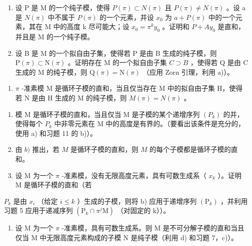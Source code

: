 \begin{enumerate}
\def\labelenumi{\alph{enumi})}
\item
  设 P 是 M 的一个纯子模，使得 \(P(\pi) \subset N(\pi)\) 且 \(P(\pi) \neq N(\pi)\) 。设 a 是 \(N(\pi)\) 中不属于 \(P(\pi)\) 的一个元素，并设 \(x_{0}\) 为 \(a + P(\pi)\) 中的一个元素，其在 M 中的高度 k 尽可能大；设 \(x_{0} = \pi^{k} y_{0}\) 。证明和 \(P + Ay_{0}\) 是直和，并且是 M 的一个纯子模。
\item
  设 B 是 M 的一个拟自由子集，使得若 P 是由 B 生成的纯子模，则 \(\mathrm{P}(\pi) \subset \mathrm{N}(\pi)\) 。证明存在 M 的一个拟自由子集 \(C \supset B\) ，使得若 Q 是由 C 生成的 M 的纯子模，则 \(\mathrm{Q}(\pi) = \mathrm{N}(\pi)\) （应用 Zorn 引理，利用 a)）。
\end{enumerate}

\begin{enumerate}
\def\labelenumi{\arabic{enumi})}
\setcounter{enumi}{11}
\tightlist
\item
  \(\pi\) -准素模 M 是循环子模的直和，当且仅当存在 M 中的拟自由子集 H，使得若 N 是由 H 生成的 M 的纯子模，则 \(M(\pi) = N(\pi)\) 。
\end{enumerate}

\begin{enumerate}
\def\labelenumi{\alph{enumi})}
\setcounter{enumi}{1}
\item
  模 M 是循环子模的直和，当且仅当 M 是子模的某个递增序列 \((P_{k})\) 的并，使得每个 \(P_{k}\) 中非零元素在 M 中的高度是有界的。（要看出该条件是充分的，使用 a) 和习题 11 的 b)）。
\item
  由 \(b)\) 推出，若 \(M\) 是循环子模的直和，则 \(M\) 的每个子模都是循环子模的直和。
\item
  设 M 为一个 \(\pi\) -准素模，没有无限高度元素，具有可数生成系（ \(x_{k}\) ）。证明 M 是循环子模的直和（若
\end{enumerate}

\(P_{k}\) 是由 \(x_{i}\) （给定 \(i \leqslant k\) ）生成的子模，则将 b) 应用于递增序列 \((\mathrm{P}_{k})\) ，并利用习题 5 应用于递减序列 \((\mathrm{P}_{k} \cap \pi^{j}\mathrm{M})\) （对固定的 k））。

\begin{enumerate}
\def\labelenumi{\alph{enumi})}
\setcounter{enumi}{4}
\tightlist
\item
  设 M 为一个 \(\pi\) -准素模，具有可数生成系。则 M 是不可分解子模的直和当且仅当 M 中无限高度元素构成的子模 N 是纯子模（利用 d) 和习题 7，c)）。
\end{enumerate}

